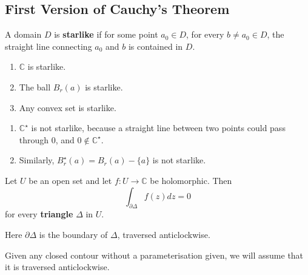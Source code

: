 \subsection{First Version of Cauchy's Theorem}

\begin{definition}
	A domain $D$ is \textbf{starlike} if for some point $a_0 \in D$, for every $b \ne a_0 \in D$, the straight line connecting $a_0$ and $b$ is contained in $D$.
\end{definition}

\begin{example}
	\hfill
	\begin{enumerate}
		\item $\mathbb{C}$ is starlike.
		\item The ball $B_r(a)$ is starlike.
		\item Any convex set is starlike.
	\end{enumerate}
\end{example}

\begin{example}
	\hfill
	\begin{enumerate}
		\item $\mathbb{C}^{\star}$ is not starlike, because a straight line between two points could pass through $0$, and $0 \notin \mathbb{C}^{\star}$.
		\item Similarly, $B_r^{\star}(a) = B_r(a) - \{ a \}$ is not starlike.
	\end{enumerate}
\end{example}

\begin{lemma}\label{lem:ctLem1}
	Let $U$ be an open set and let $f: U \rightarrow \mathbb{C}$ be holomorphic. Then
	\[
		\int_{\partial \Delta} f(z) dz = 0
	\]
	for every \textbf{triangle} $\Delta$ in $U$.
\end{lemma}

\begin{remark}
	Here $\partial \Delta$ is the boundary of $\Delta$, traversed anticlockwise.
\end{remark}

\begin{remark}
	Given any closed contour without a parameterisation given, we will assume that it is traversed anticlockwise.
\end{remark}

